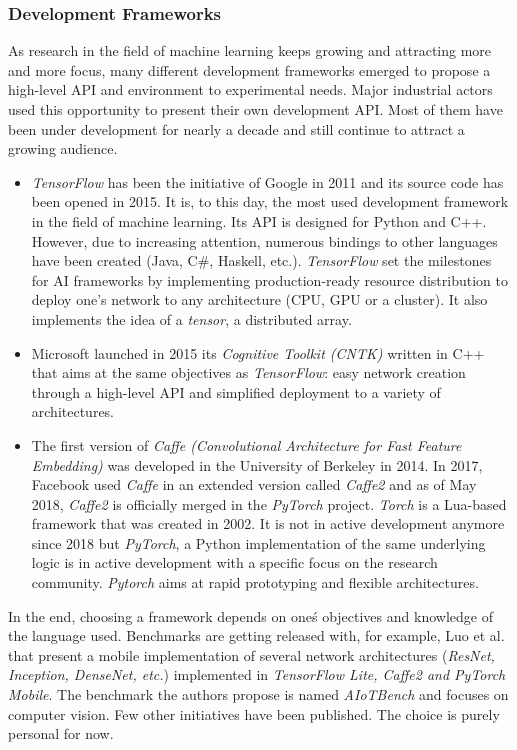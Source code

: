 \subsubsection{Development Frameworks}

As research in the field of machine learning keeps growing and attracting more and more focus, many different development frameworks emerged to propose a high-level API and environment to experimental needs. Major industrial actors used this opportunity to present their own development API. Most of them have been under development for nearly a decade and still continue to attract a growing audience.

\begin{itemize}
  \item \emph{TensorFlow} has been the initiative of Google in 2011 and its source code has been opened in 2015. It is, to this day, the most used development framework in the field of machine learning. Its API is designed for Python and C++. However, due to increasing attention, numerous bindings to other languages have been created (Java, C\#, Haskell, etc.). \emph{TensorFlow} set the milestones for AI frameworks by implementing production-ready resource distribution to deploy one's network to any architecture (CPU, GPU or a cluster). It also implements the idea of a \emph{tensor}, a distributed array.
  \item Microsoft launched in 2015 its \emph{Cognitive Toolkit (CNTK)} written in C++ that aims at the same objectives as \emph{TensorFlow}: easy network creation through a high-level API and simplified deployment to a variety of architectures.
  \item The first version of \emph{Caffe (Convolutional Architecture for Fast Feature Embedding)} was developed in the University of Berkeley in 2014. In 2017, Facebook used \emph{Caffe} in an extended version called \emph{Caffe2} and as of May 2018, \emph{Caffe2} is officially merged in the \emph{PyTorch} project.
  \emph{Torch} is a Lua-based framework that was created in 2002. It is not in active development anymore since 2018 but \emph{PyTorch}, a Python implementation of the same underlying logic is in active development with a specific focus on the research community. \emph{Pytorch} aims at rapid prototyping and flexible architectures.
\end{itemize}

In the end, choosing a framework depends on one\'s objectives and knowledge of the language used. Benchmarks are getting released with, for example, Luo et al. \cite{Luo2020} that present a mobile implementation of several network architectures (\emph{ResNet, Inception, DenseNet, etc.}) implemented in \emph{TensorFlow Lite, Caffe2 and PyTorch Mobile}. The benchmark the authors propose is named \emph{AIoTBench} and focuses on computer vision. Few other initiatives have been published. The choice is purely personal for now.


